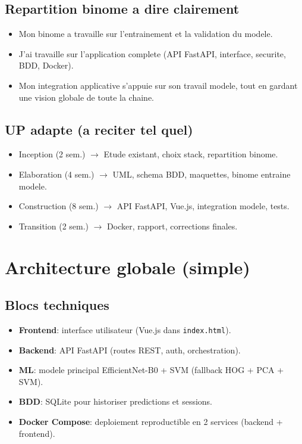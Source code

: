 \documentclass[12pt,a4paper]{article}
\begin{document}
\subsection{Repartition binome a dire clairement}
\begin{itemize}
  \item Mon binome a travaille sur l'entrainement et la validation du modele.
  \item J'ai travaille sur l'application complete (API FastAPI, interface, securite, BDD, Docker).
  \item Mon integration applicative s'appuie sur son travail modele, tout en gardant une vision globale de toute la chaine.
\end{itemize}

\subsection{UP adapte (a reciter tel quel)}
\begin{itemize}
  \item Inception (2 sem.) $\rightarrow$ Etude existant, choix stack, repartition binome.
  \item Elaboration (4 sem.) $\rightarrow$ UML, schema BDD, maquettes, binome entraine modele.
  \item Construction (8 sem.) $\rightarrow$ API FastAPI, Vue.js, integration modele, tests.
  \item Transition (2 sem.) $\rightarrow$ Docker, rapport, corrections finales.
\end{itemize}

\section{Architecture globale (simple)}
\subsection{Blocs techniques}
\begin{itemize}
  \item \textbf{Frontend}: interface utilisateur (Vue.js dans \texttt{index.html}).
  \item \textbf{Backend}: API FastAPI (routes REST, auth, orchestration).
  \item \textbf{ML}: modele principal EfficientNet-B0 + SVM (fallback HOG + PCA + SVM).
  \item \textbf{BDD}: SQLite pour historiser predictions et sessions.
  \item \textbf{Docker Compose}: deploiement reproductible en 2 services (backend + frontend).
\end{itemize}
\end{document}
